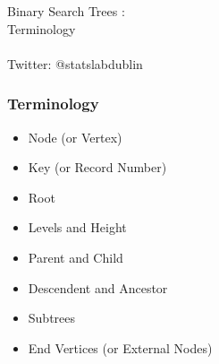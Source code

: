 \documentclass{beamer}
\begin{document}
\begin{frame}



\begin{center}
{\Huge Binary Search Trees : }\\\vspace{0.3cm} {\Huge Terminology} \\\\ \vspace{0.4cm}
{\Large Twitter: @statslabdublin}
\end{center}


\end{frame}
\begin{frame}

\frametitle{Terminology}
{\Large
\begin{itemize}
\item Node (or Vertex)
\item Key (or Record Number)
\item Root
\item Levels and Height
\item Parent and Child
\item Descendent and Ancestor
\item Subtrees
\item End Vertices (or External Nodes)
\end{itemize}
}
\end{frame}
\end{document}
